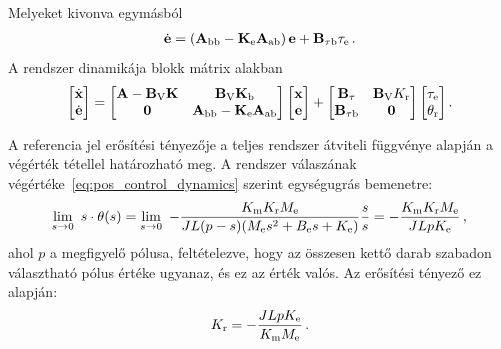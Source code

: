 Melyeket kivonva egymásból
\begin{align}
    \dot{\mathbf{e}} = \left(\mathbf{A}_{\mathrm{bb}} - \mathbf{K}_{\mathrm{e}} \mathbf{A}_{\mathrm{ab}}\right) \mathbf{e} + \mathbf{B}_{\mathrm{\tau b}} \tau_{\mathrm{e}}\,.
\end{align}
A rendszer dinamikája blokk mátrix alakban
\begin{align}\label{eq:pos_control_dynamics}
    \begin{bmatrix}
        \dot{\mathbf{x}} \\
        \dot{\mathbf{e}}
    \end{bmatrix}
    =
    \begin{bmatrix}
        \mathbf{A} - \mathbf{B}_{\mathrm{V}} \mathbf{K} & \mathbf{B}_{\mathrm{V}} \mathbf{K}_{\mathrm{b}} \\
        \mathbf{0} & \mathbf{A}_{\mathrm{bb}} - \mathbf{K}_{\mathrm{e}} \mathbf{A}_{\mathrm{ab}}
    \end{bmatrix}
    \begin{bmatrix}
        \mathbf{x} \\
        \mathbf{e}
    \end{bmatrix}
    +
    \begin{bmatrix}
        \mathbf{B}_{\mathrm{\tau}} & \mathbf{B}_{\mathrm{V}} K_{\mathrm{r}}\\
        \mathbf{B}_{\mathrm{\tau b}} & \mathbf{0}
    \end{bmatrix}
    \begin{bmatrix}
        \tau_{\mathrm{e}} \\
        \theta_{\mathrm{r}}
    \end{bmatrix}.
\end{align}

A referencia jel erősítési tényezője a teljes rendszer átviteli függvénye alapján a végérték tétellel határozható meg.
A rendszer válaszának végértéke~\eqref{eq:pos_control_dynamics} szerint egységugrás bemenetre:
\begin{equation}\label{eq:input_gain}
    \lim_{s \to 0}~s \cdot \theta(s) = 
    \lim_{s \to 0}~-\frac{K_{\mathrm{m}} K_{\mathrm{r}} M_{\mathrm{e}}}{JL(p-s)(M_{\mathrm{e}} s^2 + B_{\mathrm{e}} s + K_{\mathrm{e}})}\frac{s}{s} =
    -\frac{K_{\mathrm{m}} K_{\mathrm{r}} M_{\mathrm{e}}}{JLpK_{\mathrm{e}}}\,,
\end{equation}
ahol \(p\) a megfigyelő pólusa, feltételezve, hogy az összesen kettő darab szabadon választható pólus értéke ugyanaz, 
és ez az érték valós. Az erősítési tényező ez alapján:
\begin{equation}\label{eq:input_coeff}
    K_{\mathrm{r}} = -\frac{JLpK_{\mathrm{e}}}{K_{\mathrm{m}} M_{\mathrm{e}}}\,.
\end{equation}

